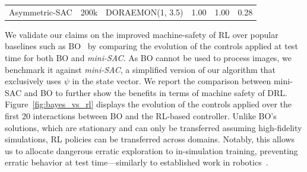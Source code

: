 \begin{table}
{{\begin{tabular}{cccccc}
        \rowcolor[HTML]{EFEFEF} 
        Asymmetric-SAC     & 200k                                                                  & DORAEMON(1, 3.5)                                                         & 1.00                                                                         & 1.00                                                                          & 0.28                                                                         
    \end{tabular}
    }
    }
\end{table}

We validate our claims on the improved machine-safety of RL over popular baselines such as BO~\citep{shalloo2020automation} by comparing the evolution of the controls applied at test time for both BO and \emph{mini-SAC}. 
As BO cannot be used to process images, we benchmark it against \emph{mini-SAC}, a simplified version of our algorithm that exclusively uses \( \psi \) in the state vector.
We report the comparison between mini-SAC and BO to further show the benefits in terms of machine safety of DRL.
Figure~\ref{fig:bayes_vs_rl} displays the evolution of the controls applied over the first 20 interactions between BO and the RL-based controller. 
Unlike BO's solutions, which are stationary and can only be transferred assuming high-fidelity simulations, RL policies can be transferred across domains.
Notably, this allows us to allocate dangerous erratic exploration to in-simulation training, preventing erratic behavior at test time---similarly to established work in robotics~\citep{kober2013reinforcement}.

